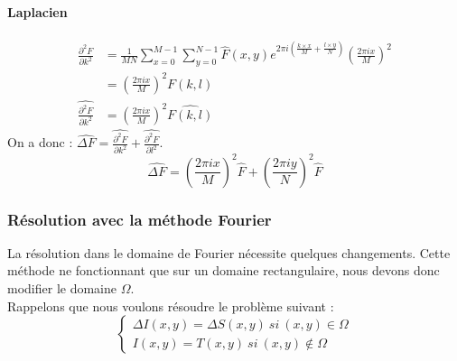 \paragraph{Laplacien}
\begin{equation}
\begin{aligned}
\frac{\partial^2 F}{\partial k ^2} & = \frac{1}{MN} \sum_{x = 0}^{M-1} \sum_{y = 0}^{N-1} \widehat{F}(x,y) e^{2\pi i\left(\frac{k\times x}{M}+\frac{l\times y}{N}\right)}\left(\frac{2\pi i x}{M}\right)^2\\
& = \left(\frac{2\pi i x}{M}\right)^2 F(k,l)\\
\widehat{\frac{\partial^2 F}{\partial k^2}} &= \left(\frac{2\pi i x}{M}\right)^2\widehat{F(k,l)}
\end{aligned}
\end{equation}
On a donc : 
$\widehat{\Delta F} = \widehat{\frac{\partial^2 F}{\partial k^2}}+ \widehat{\frac{\partial^2 F}{\partial l^2}}$.
\begin{equation}
\widehat{\Delta F} = \left(\frac{2\pi i x}{M}\right)^2 \widehat{F}+\left(\frac{2\pi i y}{N}\right)^2 \widehat{F}
\end{equation}

\subsubsection{Résolution avec la méthode Fourier}
La résolution dans le domaine de Fourier nécessite quelques changements. Cette méthode ne fonctionnant que sur un domaine rectangulaire, nous devons donc modifier le domaine $\Omega$.\\
Rappelons que nous voulons résoudre le problème suivant :
\begin{equation}
\left\{
\begin{aligned}
\Delta I(x,y) = \Delta S(x,y) \ si \ (x,y) \in \Omega\\
I(x,y) = T(x,y) \ si \ (x,y) \notin \Omega
\end{aligned}
\right.
\end{equation}

